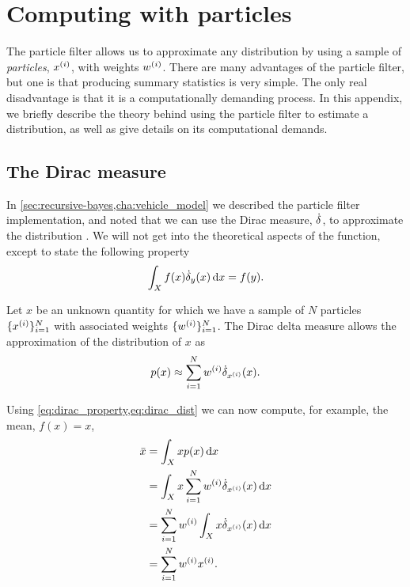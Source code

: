 \chapter{Computing with particles}
\label{app:computing-with-particles}

\phantom{\gps{}\gps{}\gps{}}

The particle filter allows us to approximate any distribution by using a sample of \emph{particles}, $x^{(i)}$, with weights $w^{(i)}$. There are many advantages of the particle filter, but one is that producing summary statistics is very simple. The only real disadvantage is that it is a computationally demanding process. In this appendix, we briefly describe the theory behind using the particle filter to estimate a distribution, as well as give details on its computational demands.


\section{The Dirac measure}
\label{app:dirac-delta-measure}

In \cref{sec:recursive-bayes,cha:vehicle_model} we described the particle filter implementation, and noted that we can use the Dirac measure, $\dot\delta$, to approximate the distribution \citep{Benedetto_1996}. We will not get into the theoretical aspects of the function, except to state the following property
\:
\begin{equation}
\label{eq:dirac_property}
\int_X f(x) \dot\delta_y(x)\,\mathrm{d}x = f(y).
\end{equation}

Let $x$ be an unknown quantity for which we have a sample of $N$ particles $\{x^{(i)}\}_{i=1}^N$ with associated weights $\{w^{(i)}\}_{i=1}^N$. The Dirac delta measure allows the approximation of the distribution of $x$ as
\begin{equation}
\label{eq:dirac_dist}
p(x) \approx \sum_{i=1}^N w^{(i)} \dot\delta_{x^{(i)}}(x).
\end{equation}


Using \cref{eq:dirac_property,eq:dirac_dist} we can now compute, for example, the mean, $f(x) = x$,
\begin{equation}
\label{eq:dirac_mean}
\begin{split}
\bar x &= \int_X x p(x) \,\mathrm{d}x \\
&= \int_X x \sum_{i=1}^N w^{(i)} \dot\delta_{x^{(i)}}(x) \,\mathrm{d}x \\
&= \sum_{i=1}^N w^{(i)} \int_X x \dot\delta_{x^{(i)}}(x) \,\mathrm{d}x \\
&= \sum_{i=1}^N w^{(i)} x^{(i)}.
\end{split}
\end{equation}



